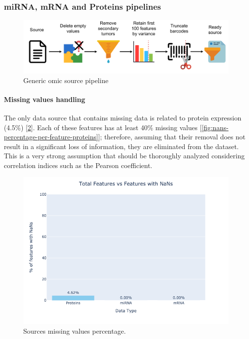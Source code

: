 \documentclass[12pt,a4paper]{article}
\begin{document}
\subsubsection{miRNA, mRNA and Proteins pipelines}
\begin{figure}[htbp!]
\begin{center}
\includegraphics[width=0.9\columnwidth]{./static/experiment_pipeline.png}
\end{center}
\caption{Generic omic source pipeline}
\label{fig:experiment_pipeline}
\end{figure}

\paragraph{Missing values handling} \hfill \break
The only data source that contains missing data is related to protein expression (4.5\%) [\ref{fig:total-features-vs-features-with-nans}].
Each of these features has at least 40\% missing values [\ref{fig:nans-percentage-per-feature-proteins}]; therefore, assuming that their removal does not result in a significant loss of information, they are eliminated from the dataset. This is a very strong assumption that should be thoroughly analyzed considering correlation indices such as the Pearson coefficient.

\begin{figure}[htbp!]
\begin{center}
\includegraphics[width=0.9\columnwidth]{./static/total-features-vs-features-with-nans.png}
\end{center}
\caption{Sources missing values percentage.}
\label{fig:total-features-vs-features-with-nans}
\end{figure}
\end{document}
